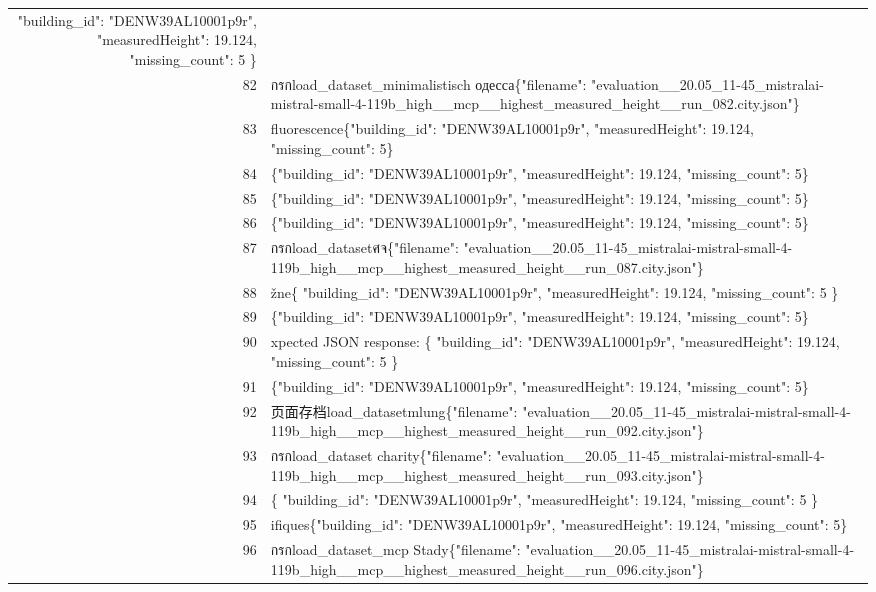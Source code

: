 \documentclass[a4paper,11pt]{article}
\begin{document}
\begin{table}[ht]
\begin{tabular}{r p{12cm}}
  "building\_id": "DENW39AL10001p9r",
  "measuredHeight": 19.124,
  "missing\_count": 5
\} \\
82 &  กรกload\_dataset\_minimalistisch одесса\{"filename": "evaluation\_\_20.05\_11-45\_mistralai-mistral-small-4-119b\_high\_\_mcp\_\_highest\_measured\_height\_\_run\_082.city.json"\} \\
83 &  fluorescence\{"building\_id": "DENW39AL10001p9r", "measuredHeight": 19.124, "missing\_count": 5\} \\
84 & \{"building\_id": "DENW39AL10001p9r", "measuredHeight": 19.124, "missing\_count": 5\} \\
85 & \{"building\_id": "DENW39AL10001p9r", "measuredHeight": 19.124, "missing\_count": 5\} \\
86 & \{"building\_id": "DENW39AL10001p9r", "measuredHeight": 19.124, "missing\_count": 5\} \\
87 &  กรกload\_datasetศจ\{"filename": "evaluation\_\_20.05\_11-45\_mistralai-mistral-small-4-119b\_high\_\_mcp\_\_highest\_measured\_height\_\_run\_087.city.json"\} \\
88 & žne\{
  "building\_id": "DENW39AL10001p9r",
  "measuredHeight": 19.124,
  "missing\_count": 5
\} \\
89 & \{"building\_id": "DENW39AL10001p9r", "measuredHeight": 19.124, "missing\_count": 5\} \\
90 & xpected JSON response:
\{
  "building\_id": "DENW39AL10001p9r",
  "measuredHeight": 19.124,
  "missing\_count": 5
\} \\
91 & \{"building\_id": "DENW39AL10001p9r", "measuredHeight": 19.124, "missing\_count": 5\} \\
92 & 页面存档load\_datasetmlung\{"filename": "evaluation\_\_20.05\_11-45\_mistralai-mistral-small-4-119b\_high\_\_mcp\_\_highest\_measured\_height\_\_run\_092.city.json"\} \\
93 &  กรกload\_dataset charity\{"filename": "evaluation\_\_20.05\_11-45\_mistralai-mistral-small-4-119b\_high\_\_mcp\_\_highest\_measured\_height\_\_run\_093.city.json"\} \\
94 & \{
  "building\_id": "DENW39AL10001p9r",
  "measuredHeight": 19.124,
  "missing\_count": 5
\} \\
95 & ifiques\{"building\_id": "DENW39AL10001p9r", "measuredHeight": 19.124, "missing\_count": 5\} \\
96 &  กรกload\_dataset\_mcp Stady\{"filename": "evaluation\_\_20.05\_11-45\_mistralai-mistral-small-4-119b\_high\_\_mcp\_\_highest\_measured\_height\_\_run\_096.city.json"\} \\

\end{tabular}
\end{table}
\end{document}
